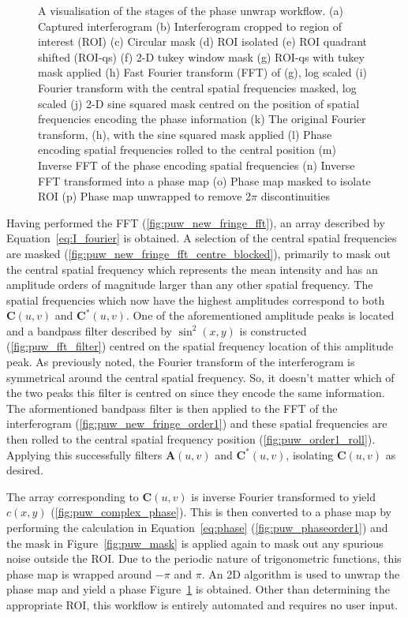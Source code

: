 \begin{figure}
\begin{subfigure}{0.23\textwidth}
		\caption{}
		\label{fig:puw_unwrapped_phase}
	\end{subfigure}
	\caption{A visualisation of the stages of the phase unwrap workflow. (a) Captured interferogram (b) Interferogram cropped to region of interest (ROI) (c) Circular mask (d) ROI isolated (e) ROI quadrant shifted (ROI-qs) (f) 2-D tukey window mask (g) ROI-qs with tukey mask applied (h) Fast Fourier transform (FFT) of (g), log scaled (i) Fourier transform with the central spatial frequencies masked, log scaled (j) 2-D sine squared mask centred on the position of spatial frequencies encoding the phase information (k) The original Fourier transform, (h), with the sine squared mask applied (l) Phase encoding spatial frequencies rolled to the central position (m) Inverse FFT of the phase encoding spatial frequencies (n) Inverse FFT transformed into a phase map (o) Phase map masked to isolate ROI (p) Phase map unwrapped to remove 2$\pi$ discontinuities}
	\label{fig:phase_unwrap_workflow}
\end{figure}

Having performed the FFT (\ref{fig:puw_new_fringe_fft}), an array described by Equation~\ref{eq:I_fourier} is obtained. A selection of the central spatial frequencies are masked (\ref{fig:puw_new_fringe_fft_centre_blocked}), primarily to mask out the central spatial frequency which represents the mean intensity and has an amplitude orders of magnitude larger than any other spatial frequency. The spatial frequencies which now have the highest amplitudes correspond to both $\boldsymbol{C}(u,v)$ and $\boldsymbol{C}^{*}(u,v)$. One of the aforementioned amplitude peaks is located and a bandpass filter described by $\sin^{2}(x,y)$ is constructed (\ref{fig:puw_fft_filter}) centred on the spatial frequency location of this amplitude peak. As previously noted, the Fourier transform of the interferogram is symmetrical around the central spatial frequency. So, it doesn't matter which of the two peaks this filter is centred on since they encode the same information. The aformentioned bandpass filter is then applied to the FFT of the interferogram (\ref{fig:puw_new_fringe_order1}) and these spatial frequencies are then rolled to the central spatial frequency position (\ref{fig:puw_order1_roll}). Applying this successfully filters $\boldsymbol{A}(u,v)$ and $\boldsymbol{C}^{*}(u,v)$, isolating $\boldsymbol{C}(u,v)$ as desired.

The array corresponding to $\boldsymbol{C}(u,v)$ is inverse Fourier transformed to yield $c(x,y)$ (\ref{fig:puw_complex_phase}). This is then converted to a phase map by performing the calculation in Equation~\ref{eq:phase} (\ref{fig:puw_phaseorder1}) and the mask in Figure~\ref{fig:puw_mask} is applied again to mask out any spurious noise outside the ROI. Due to the periodic nature of trigonometric functions, this phase map is wrapped around $-\pi$ and $\pi$. An 2D  algorithm is used to unwrap the phase map and yield a phase Figure~\ref{fig:puw_unwrapped_phase} is obtained.\cite{herraez2002fast} Other than determining the appropriate ROI, this workflow is entirely automated and requires no user input. 

